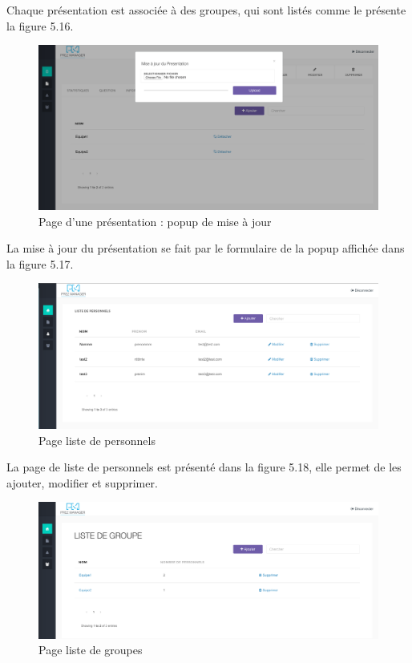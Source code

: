 \documentclass[12pt, ChapStyle1, oneside]{./Styles/Dea_Gsm}
\begin{document}
Chaque présentation est associée à des groupes, qui sont listés comme le présente la figure 5.16.

\begin{figure}[H]
    \centering
    \includegraphics[width=6in]{screenshots/web/updateprez}
    \caption{Page d'une présentation : popup de mise à jour}

\end{figure}

La mise à jour du présentation se fait par le formulaire de la popup affichée dans la figure 5.17.

\begin{figure}[H]
    \centering
    \includegraphics[width=6in]{screenshots/web/listepersonnel}
    \caption{Page liste de personnels}
\end{figure}
La page de liste de personnels est présenté dans la figure 5.18, elle permet de les ajouter, modifier et supprimer. 

\begin{figure}[H]
    \centering
    \includegraphics[width=6in]{screenshots/web/listedegroupe}
    \caption{Page liste de groupes}

\end{figure}
\end{document}
